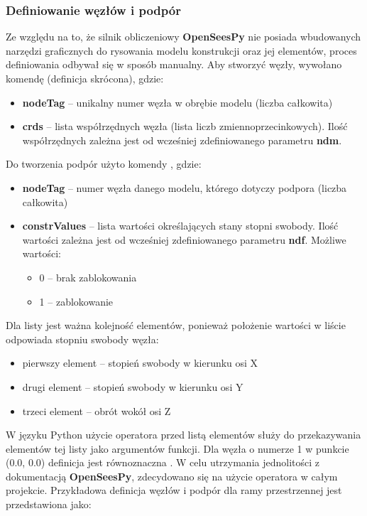 \subsubsection{Definiowanie węzłów i podpór}

Ze względu na to, że silnik obliczeniowy \textbf{OpenSeesPy} nie posiada wbudowanych narzędzi graficznych do rysowania
modelu konstrukcji oraz jej elementów, proces definiowania odbywał się w sposób manualny.
Aby stworzyć węzły, wywołano komendę  (definicja skrócona), gdzie:

\begin{itemize}
    \item \textbf{nodeTag} – unikalny numer węzła w obrębie modelu (liczba całkowita)
    \item \textbf{crds} – lista współrzędnych węzła (lista liczb zmiennoprzecinkowych). Ilość współrzędnych zależna jest od wcześniej zdefiniowanego parametru \textbf{ndm}.
\end{itemize}

Do tworzenia podpór użyto komendy , gdzie:

\begin{itemize}
    \item \textbf{nodeTag} – numer węzła danego modelu, którego dotyczy podpora (liczba całkowita)
    \item \textbf{constrValues} – lista wartości określających stany stopni swobody. Ilość wartości zależna jest od wcześniej zdefiniowanego parametru \textbf{ndf}. Możliwe wartości:
    \begin{itemize}
        \item 0 – brak zablokowania
        \item 1 – zablokowanie
    \end{itemize}
\end{itemize}

Dla listy  jest ważna kolejność elementów, ponieważ położenie wartości w liście odpowiada stopniu swobody węzła:
\begin{itemize}
    \item pierwszy element – stopień swobody w kierunku osi X
    \item drugi element – stopień swobody w kierunku osi Y
    \item trzeci element – obrót wokół osi Z
\end{itemize}

W języku Python użycie operatora \inlinecode{*} przed listą elementów służy do przekazywania elementów tej listy jako argumentów funkcji.
Dla węzła o numerze 1 w punkcie (0.0, 0.0) definicja  jest równoznaczna .
W celu utrzymania jednolitości z dokumentacją \textbf{OpenSeesPy}, zdecydowano się na użycie operatora \inlinecode{*} w całym projekcie.
Przykładowa definicja węzłów i podpór dla ramy przestrzennej jest przedstawiona jako:

